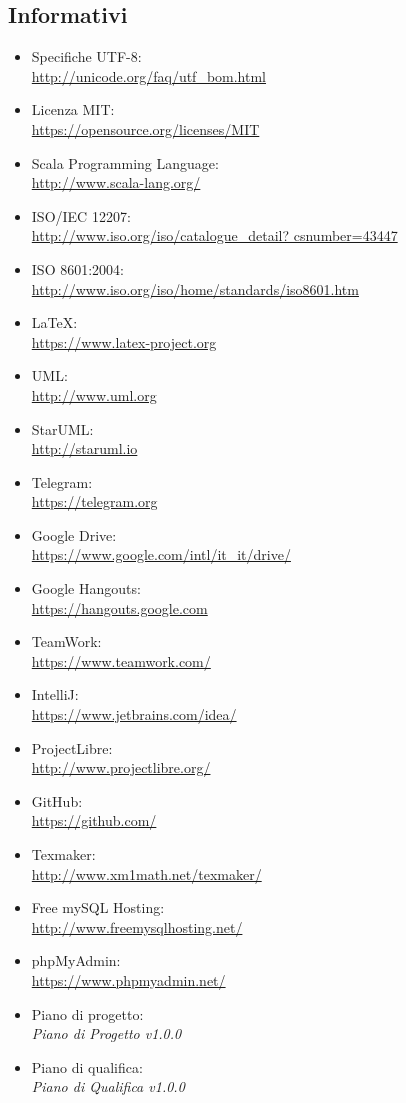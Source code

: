 \documentclass[a4paper]{report}
\begin{document}
		\subsection{Informativi}
			\begin{itemize}
				\item Specifiche UTF-8: \\ \url{http://unicode.org/faq/utf_bom.html}
				\item Licenza MIT: \\ \url{https://opensource.org/licenses/MIT}
				\item Scala Programming Language: \\ \url{http://www.scala-lang.org/}
				\item ISO/IEC 12207: \\ \url{http://www.iso.org/iso/catalogue_detail?
				csnumber=43447}
				\item ISO 8601:2004: \\ \url{http://www.iso.org/iso/home/standards/iso8601.htm}
				\item \LaTeX: \\ \url{https://www.latex-project.org}
				\item UML: \\ \url{http://www.uml.org}
				\item StarUML: \\ \url{http://staruml.io}
				\item Telegram: \\ \url{https://telegram.org}
				\item Google Drive: \\ \url{https://www.google.com/intl/it_it/drive/}
				\item Google Hangouts: \\ \url{https://hangouts.google.com}
				\item TeamWork: \\ \url{https://www.teamwork.com/}
				\item IntelliJ: \\ \url{https://www.jetbrains.com/idea/}
				\item ProjectLibre: \\ \url{http://www.projectlibre.org/}
				\item GitHub: \\ \url{https://github.com/}
				\item Texmaker: \\ \url{http://www.xm1math.net/texmaker/}
				\item Free mySQL Hosting: \\ \url{http://www.freemysqlhosting.net/} 
				\item phpMyAdmin: \\ \url{https://www.phpmyadmin.net/}
				\item Piano di progetto: \\ \emph{Piano di Progetto v1.0.0}
				\item Piano di qualifica: \\ \emph{Piano di Qualifica v1.0.0}
			\end{itemize}
\end{document}
